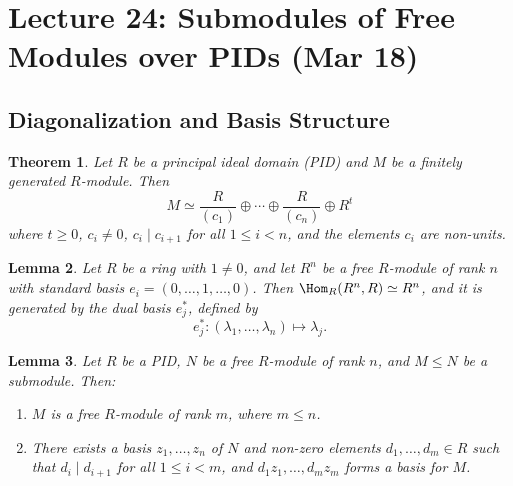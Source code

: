 \documentclass[a4paper,12pt]{article}
\newtheorem{thm}{Theorem}[section]
\newtheorem{lem}[thm]{Lemma}
\begin{document}
\section{Lecture 24: Submodules of Free Modules over PIDs (Mar 18)}
\subsection{Diagonalization and Basis Structure}
\begin{thm}
    Let $R$ be a principal ideal domain (PID) and $M$ be a finitely generated $R$-module. Then 
    \[
    M \simeq \frac{R}{(c_1)} \oplus \cdots \oplus \frac{R}{(c_n)} \oplus R^t
    \]
    where $t \ge 0$, $c_i \neq 0$, $c_i \mid c_{i+1}$ for all $1 \leq i < n$, and the elements $c_i$ are non-units. 
\end{thm}

\begin{lem}
    Let $R$ be a ring with $1 \neq 0$, and let $R^n$ be a free $R$-module of rank $n$ with standard basis $e_i = (0, \dots, 1, \dots, 0)$. Then $\Hom_R(R^n, R) \simeq R^n$, and it is generated by the dual basis $e_j^*$, defined by
    \[
    e_j^* : (\lambda_1, \dots, \lambda_n) \mapsto \lambda_j.
    \]
\end{lem}

\begin{lem}
    Let $R$ be a PID, $N$ be a free $R$-module of rank $n$, and $M \leq N$ be a submodule. Then:
    \begin{enumerate}
        \item $M$ is a free $R$-module of rank $m$, where $m \leq n$.
        \item There exists a basis $z_1, \dots, z_n$ of $N$ and non-zero elements $d_1, \dots, d_m \in R$ such that $d_i \mid d_{i+1}$ for all $1 \leq i < m$, and $d_1z_1, \dots, d_m z_m$ forms a basis for $M$.
    \end{enumerate}
\end{lem}
\end{document}
